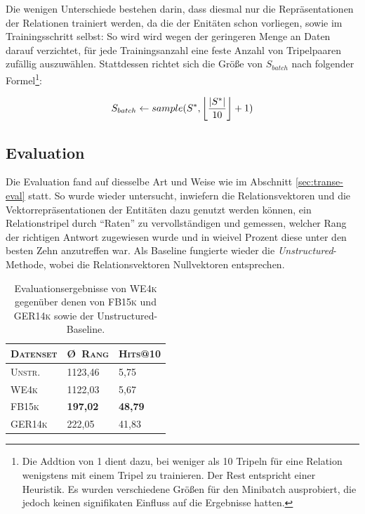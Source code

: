 Die wenigen Unterschiede bestehen darin, dass diesmal nur die Repräsentationen der Relationen trainiert werden,
da die der Enitäten schon vorliegen, sowie im Trainingsschritt selbst: So wird wird wegen der geringeren Menge an
Daten darauf verzichtet, für jede Trainingsanzahl eine feste Anzahl von Tripelpaaren zufällig auszuwählen.
Stattdessen richtet sich die Größe von $S_{batch}$ nach folgender Formel\footnote{Die Addtion von 1 dient dazu, bei weniger
als 10 Tripeln für eine Relation wenigstens mit einem Tripel zu trainieren. Der Rest entspricht einer Heuristik. Es wurden
verschiedene Größen für den Minibatch ausprobiert, die jedoch keinen signifikaten Einfluss auf die Ergebnisse hatten.}:

\begin{equation}
  S_{batch} \leftarrow sample(S^*, \floor*{\frac{|S^*|}{10}}+1)
\end{equation}

\subsection{Evaluation}

Die Evaluation fand auf diesselbe Art und Weise wie im Abschnitt \ref{sec:transe-eval} statt. So wurde wieder untersucht,
inwiefern die Relationsvektoren und die Vektorrepräsentationen der Entitäten dazu genutzt werden können, ein Relationstripel
durch ``Raten'' zu vervollständigen und gemessen, welcher Rang der richtigen Antwort zugewiesen wurde und in wieivel Prozent
diese unter den besten Zehn anzutreffen war. Als Baseline fungierte wieder die \emph{Unstructured}-Methode, wobei die Relationsvektoren
Nullvektoren entsprechen.

\begin{table}[h]
  \centering
  \begin{tabular}{lll}
    \toprule[1.5pt]
    \textsc{Datenset} & \textsc{\O\ Rang} & \textsc{Hits@10} \\
     \toprule
     \textsc{Unstr.} & 1123,46 & 5,75 \\
     \textsc{WE4k} & 1122,03 & 5,67 \\
     \textsc{FB15k} & \textbf{197,02} & \textbf{48,79} \\
     \textsc{GER14k} & 222,05 & 41,83 \\
    \bottomrule[1.25pt]
  \end{tabular}
  \caption[Resultate auf mit Wordvektoren auf \textsc{WE3k}]{Evaluationsergebnisse von \textsc{WE4k} gegenüber denen
  von \textsc{FB15k} und \textsc{GER14k} sowie der Unstructured-Baseline.\label{fig:eval-we4k}}
\end{table}

